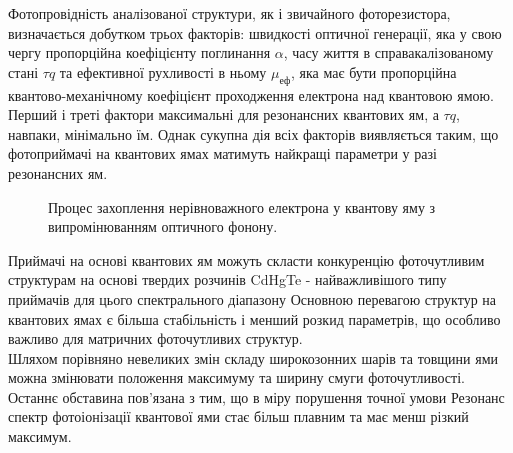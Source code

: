 \documentclass[a4paper,14pt]{extreport}
\begin{document}
Фотопровідність аналізованої структури, як і
звичайного фоторезистора, визначається добутком трьох факторів:
швидкості оптичної генерації, яка у свою чергу
пропорційна коефіцієнту поглинання $\alpha$, часу життя в
справакалізованому стані $\tau q$ та ефективної рухливості в ньому $\mu_{\text{еф}}$,
яка має бути пропорційна квантово-механічному
коефіцієнт проходження електрона над квантовою ямою. Перший і
треті фактори максимальні для резонансних квантових ям, а $\tau q$,
навпаки, мінімально їм. Однак сукупна дія всіх
факторів виявляється таким, що фотоприймачі на квантових
ямах матимуть найкращі параметри у разі резонансних ям.\\ 

\begin{figure}[h!]
   \caption{Процес захоплення нерівноважного електрона у квантову
яму з випромінюванням оптичного фонону.}
   \label{r3}
 \end{figure}

 Приймачі на основі квантових ям можуть скласти
конкуренцію фоточутливим структурам на основі твердих
розчинів CdHgTe - найважливішого типу приймачів для цього
спектрального діапазону Основною перевагою структур на
квантових ямах є більша стабільність і менший розкид
параметрів, що особливо важливо для матричних фоточутливих
структур.\\ 

Шляхом порівняно невеликих змін складу
широкозонних шарів та товщини ями можна змінювати положення
максимуму та ширину смуги фоточутливості. Останнє
обставина пов'язана з тим, що в міру порушення точної умови
Резонанс спектр фотоіонізації квантової ями стає більш
плавним та має менш різкий максимум.\\ 
\end{document}
